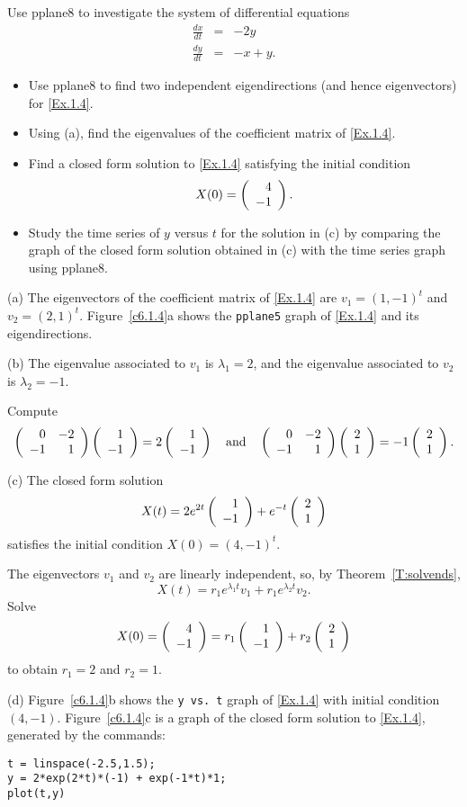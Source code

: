 \documentclass{ximera}
\begin{document}
\begin{exercise} \label{c6.1.4}
Use {\sf pplane8} to investigate the system
of differential equations
\begin{equation}  \label{Ex.1.4}
\begin{array}{rcr}
\frac{dx}{dt}  & = & -2y \\
\frac{dy}{dt}  & = &  -x+y.
\end{array}
\end{equation}
\begin{itemize}
\item[(a)] Use {\sf pplane8} to find two independent eigendirections (and
hence eigenvectors) for \eqref{Ex.1.4}.
\item[(b)] Using (a), find the eigenvalues of the coefficient matrix of
\eqref{Ex.1.4}.
\item[(c)] Find a closed form solution to \eqref{Ex.1.4} satisfying the initial
condition
\[
X(0) = \left(\begin{array}{r} 4 \\ -1\end{array}\right).
\]
\item[(d)] Study the time series of $y$ versus $t$ for the solution in (c)
by comparing the graph of the closed form solution obtained in (c) with the
time series graph using {\sf pplane8}.
\end{itemize}

\begin{solution}

(a) The eigenvectors of the coefficient matrix of \eqref{Ex.1.4} are
$v_1 = (1,-1)^t$ and $v_2 = (2,1)^t$.  Figure~\ref{c6.1.4}a shows
the {\tt pplane5} graph of \eqref{Ex.1.4} and its eigendirections.

(b) \ans The eigenvalue associated to $v_1$ is $\lambda_1 = 2$, and
the eigenvalue associated to $v_2$ is $\lambda_2 = -1$. 

\soln Compute
\[ \left(\begin{array}{rr} 0 & -2\\ -1 &1\end{array}\right)\left(\begin{array}{r} 1 \\ -1\end{array}\right) = 2\left(\begin{array}{r} 1 \\ -1\end{array}\right) \quad\mbox{and}\quad
\left(\begin{array}{rr} 0 & -2\\ -1 &1\end{array}\right)\left(\begin{array}{r} 2 \\ 1\end{array}\right) =  -1\left(\begin{array}{r} 2 \\ 1\end{array}\right). \]

(c) \ans The closed form solution
\[
X(t) = 2e^{2t}\left(\begin{array}{r} 1 \\ -1\end{array}\right) + e^{-t}\left(\begin{array}{r} 2 \\ 1\end{array}\right)
\]
satisfies the initial condition $X(0) = (4,-1)^t$.

\soln The eigenvectors $v_1$ and $v_2$ are linearly independent, so, by 
Theorem~\ref{T:solvends},
\[
X(t) = r_1e^{\lambda_1t}v_1 + r_1e^{\lambda_2t}v_2.
\]
Solve
\[
X(0) = \left(\begin{array}{r} 4 \\ -1\end{array}\right) = r_1\left(\begin{array}{r} 1 \\ -1\end{array}\right) + r_2\left(\begin{array}{r} 2 \\ 1\end{array}\right)
\]
to obtain $r_1 = 2$ and $r_2 = 1$.

(d) Figure~\ref{c6.1.4}b shows the {\tt y vs.\ t} graph of \eqref{Ex.1.4}
with initial condition $(4,-1)$.  Figure~\ref{c6.1.4}c is a graph of 
the closed form solution to \eqref{Ex.1.4}, generated by the \Matlab
commands:
\begin{verbatim}
t = linspace(-2.5,1.5);
y = 2*exp(2*t)*(-1) + exp(-1*t)*1;
plot(t,y)
\end{verbatim}


\end{solution}
\end{exercise}
\end{document}
